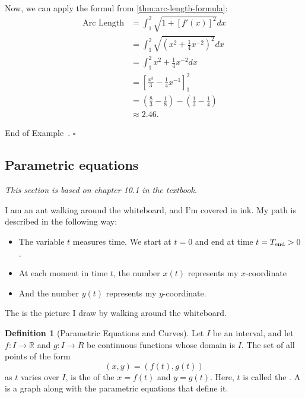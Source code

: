 \documentclass[10pt]{article}
\theoremstyle{definition}
\newtheorem{definition}[theorem]{Definition}
\newtheorem{example}[theorem]{Example}
\renewenvironment{example}
{\begin{oldexample}}
  {\par\smallskip\hfill   End of Example~\theexample. $\square$    \par\end{oldexample}}
\newcommand{\1}[1]{\textbf{1}_{\left[#1\right]}} %
\def\R{\mathbb{R}} %
\newcommand{\dempfcolor}[1]{{\color{RoyalBlue}#1}}
\newcommand{\demph}[1]{\dempfcolor{{\sl #1}}}
\begin{document}
\begin{max-comment}
\begin{example}[Arc length]
  
  Now, we can apply the formul from \cref{thm:arc-length-formula}:
  \begin{align*}
    \text{Arc Length} 
    &= \int_{1}^{2} \sqrt{1+\left[ f'(x) \right]^{2} }dx\\
    &= \int_{1}^{2} \sqrt{ \left( x^{2}+\frac{1}{4}x^{-2} \right)^{2}  }dx\\
    &= \int_{1}^{2} x^{2}+\frac{1}{4}x^{-2} dx\\
    &= \left[ \frac{x^{3}}{3} - \frac{1}{4}x^{-1} \right]^{2}_{1}\\ 
    &= \left( \frac{8}{3}- \frac{1}{8} \right) - \left( \frac{1}{3}- \frac{1}{4} \right)\\  
    &\approx 2.46.
\end{align*}
\end{example}



\subsection{Parametric equations}
\textit{This section is based on chapter 10.1 in the textbook.}


I am an ant walking around the whiteboard, and I'm covered in ink. My path is described in the following
way:
\begin{itemize}
  \item The variable $t$ measures time. We start at $t=0$ and end at time $t=T_{\rm end}>0$.
  \item At each moment in time $t$, the number $x(t)$ represents my $x$-coordinate
  \item And the number $y(t)$ represents my $y$-coordinate.
\end{itemize}
The \demph{parametric equation} is the picture I draw by walking around the whiteboard.


\begin{definition}[Parametric Equations and Curves]
  \label{def:parametric-equations-and-curves}
  Let $I$ be an interval, and let $f:I \to \R$ and $g:I\to R$ be continuous functions whose domain is $I$. The set of all points of the form
  \begin{equation*}
    (x,y) = \left( f(t),g(t) \right) 
  \end{equation*}
  as $t$ varies over $I$, is the \demph{graph} of the \demph{parametric equations} $x=f(t)$ and $y=g(t)$. Here, $t$ is
  called the \demph{parameter}. A \demph{curve} is a graph along with the parametric equations that define it.
\end{definition}


\end{max-comment}
\end{document}
